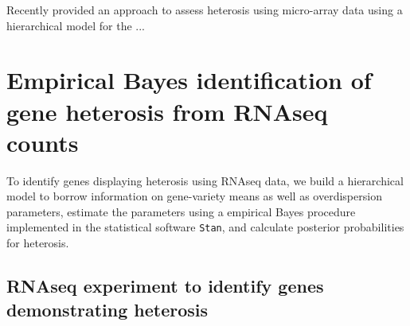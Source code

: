\documentclass[useAMS,usenatbib,referee]{biom}
\begin{document}
Recently \citep{ji2014estimation} provided an approach to assess heterosis using micro-array data using a hierarchical model for the ...


% 
% 
% 


\section{Empirical Bayes identification of gene heterosis from RNAseq counts}


To identify genes displaying heterosis using RNAseq data, we build a hierarchical model to borrow information on gene-variety means as well as overdispersion parameters, estimate the parameters using a empirical Bayes procedure implemented in the statistical software {\tt Stan}, and calculate posterior probabilities for heterosis. 

\subsection{RNAseq experiment to identify genes demonstrating heterosis}
\label{s:experiment}
\end{document}
